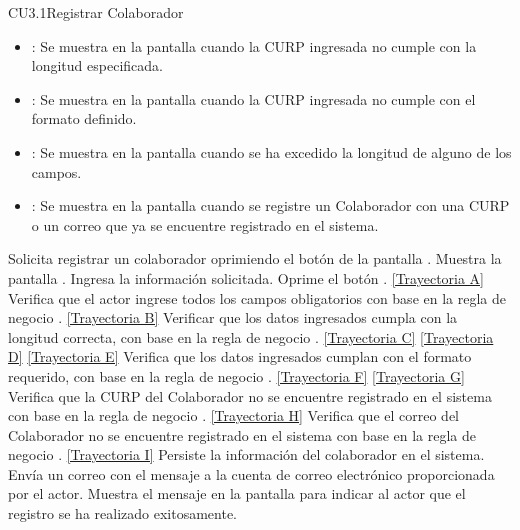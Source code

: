 \begin{UseCase}{CU3.1}{Registrar Colaborador}
{\begin{itemize}
		\item {}: Se muestra en la pantalla  cuando la CURP ingresada no cumple con la longitud especificada.
		\item {}: Se muestra en la pantalla  cuando la CURP ingresada no cumple con el formato definido.
		\item {}: Se muestra en la pantalla  cuando se ha excedido la longitud de alguno de los campos.
		\item {}: Se muestra en la pantalla  cuando se registre un Colaborador con una CURP o un correo que ya se encuentre registrado en el sistema.
		\end{itemize}
		}
	\end{UseCase}
	\begin{UCtrayectoria}
		\UCpaso[\UCactor] Solicita registrar un colaborador oprimiendo el botón  de la pantalla .
		\UCpaso[\UCsist] Muestra la pantalla .
		\UCpaso[\UCactor] Ingresa la información solicitada. \label{CU3.1-P3}
		\UCpaso[\UCactor] Oprime el botón . \hyperlink{CU3-1:TAA}{[Trayectoria A]}
		\UCpaso[\UCsist] Verifica que el actor ingrese todos los campos obligatorios con base en la regla de negocio . \hyperlink{CU3-1:TAB}{[Trayectoria B]}
		\UCpaso[\UCsist] Verificar que los datos ingresados cumpla con la longitud correcta, con base en la regla de negocio . \hyperlink{CU3-1:TAC}{[Trayectoria C]} \hyperlink{CU3-1:TAD}{[Trayectoria D]} \hyperlink{CU3-1:TAE}{[Trayectoria E]}
		\UCpaso[\UCsist] Verifica que los datos ingresados cumplan con el formato requerido, con base en la regla de negocio . \hyperlink{CU3-1:TAE}{[Trayectoria F]} \hyperlink{CU3-1:TAF}{[Trayectoria G]}
		\UCpaso[\UCsist] Verifica que la CURP del Colaborador no se encuentre registrado en el sistema con base en la regla de negocio . \hyperlink{CU3-1:TAG}{[Trayectoria H]}
		\UCpaso[\UCsist] Verifica que el correo del Colaborador no se encuentre registrado en el sistema con base en la regla de negocio . \hyperlink{CU3-1:TAH}{[Trayectoria I]}
		\UCpaso[\UCsist] Persiste la información del colaborador en el sistema.
		\UCpaso[\UCsist] Envía un correo con el mensaje  a la cuenta de correo electrónico proporcionada por el actor.
		\UCpaso[\UCsist] Muestra el mensaje  en la pantalla  para indicar al actor que el registro se ha realizado exitosamente.
	\end{UCtrayectoria}		

